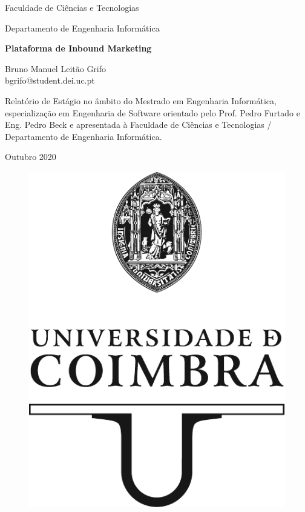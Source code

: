 

\begin{titlepage}
 

\begin{center}
\Large
Faculdade de Ciências e Tecnologias

Departamento de Engenharia Informática
\vspace{1cm}

\Huge
\textbf{\textup{\textsf{Plataforma de Inbound Marketing}}}

\LARGE

\textsf{}

\vspace{3cm}

\Large
Bruno Manuel Leitão Grifo \\
bgrifo@student.dei.uc.pt

\vspace{3cm}

\normalsize

Relatório de Estágio no âmbito do Mestrado em Engenharia Informática, especialização em Engenharia de Software orientado pelo Prof. Pedro Furtado e Eng. Pedro Beck e apresentada à Faculdade de Ciências e Tecnologias / Departamento de Engenharia Informática.


\vspace{0.5cm}

Outubro 2020

\begin{figure}[b]
	\begin{center}
	\includegraphics[width=0.3\linewidth]{images/_UC_logo.pdf}
	\label{fig:Logo}	
	\end{center}
\end{figure}


\end{center}


\end{titlepage}
\restoregeometry
